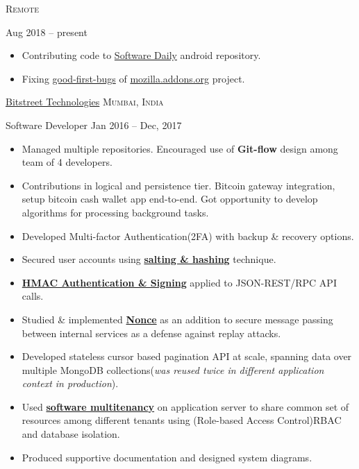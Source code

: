\documentclass[10pt,a4paper]{article}
\begin{document}


\headedsection
{}
  {\textsc{Remote}}
  {%
    \headedsubsection
    {}
    {Aug 2018 -- present}
    {
      \begin{itemize}
        \item Contributing code to \href{https://www.softwaredaily.com/}{Software Daily} android repository.
        \item Fixing \href{https://wiki.mozilla.org/Add-ons/Contribute/Recognition\#August_2018}{good-first-bugs} of \href{https://addons.mozilla.org/en-US/firefox/}{mozilla.addons.org} project.
      \end{itemize}
    }
  }

\headedsection
  {\href{http://bitstreet.in/}{Bitstreet Technologies}}
  {\textsc{Mumbai, India}}
  {%
    \headedsubsection
    {Software Developer}
    {Jan 2016 -- Dec, 2017}
    {
      \begin{itemize}
        \item Managed multiple repositories. Encouraged use of \textbf{Git-flow} design among team of 4 developers.
        \item Contributions in logical and persistence tier. Bitcoin gateway integration, setup bitcoin cash wallet app end-to-end. Got opportunity to develop algorithms for processing background tasks.
        \item Developed Multi-factor Authentication(2FA) with backup \& recovery options.
        \item Secured user accounts using \href{https://rihbyne.github.io/blog/user-auth/}{\textbf{salting \& hashing}} technique.
        \item \href{https://rihbyne.github.io/blog/hmac-authentication/}{\textbf{HMAC Authentication \& Signing}} applied to JSON-REST/RPC API calls.
        \item Studied \& implemented \href{https://rihbyne.github.io/diy/nonce-auth-systems/}{\textbf{Nonce}} as an addition to secure message passing between internal services as a defense against replay attacks.
        \item Developed stateless cursor based pagination API at scale, spanning data over multiple MongoDB collections(\textit{was reused twice in different application context in production}).
        \item Used \href{https://rihbyne.github.io/diy/multi-tenancy/}{\textbf{software multitenancy}} on application server to share common set of resources among different tenants using (Role-based Access Control)RBAC and database isolation.
        \item Produced supportive documentation and designed system diagrams.
      \end{itemize}
    }
  }
\end{document}
